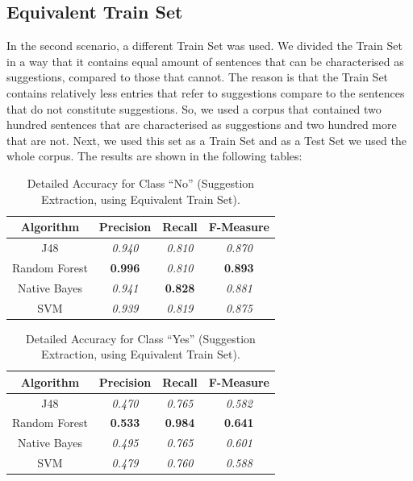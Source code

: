 \subsection{Equivalent Train Set}\label{422_ref}
In the second scenario, a different Train Set was used. We divided the Train Set in a way that it contains equal amount of sentences that can be characterised as suggestions, compared to those that cannot. The reason is that the Train Set contains relatively less entries that refer to suggestions compare to the sentences that do not constitute suggestions. So, we used a corpus that contained two hundred sentences that are characterised as suggestions and two hundred more that are not. Next, we used this set as a Train Set and as a Test Set we used the whole corpus. The results are shown in the following tables:
\begin{table}[H]
\centering
\caption{Detailed Accuracy for Class “No” (Suggestion Extraction, using Equivalent Train Set).}
\label{49_table_rer}
\begin{tabular}{cccc}
\hline
{\bf Algorithm} & {\bf Precision} & {\bf Recall} & {\bf F-Measure} \\ \hline
J48             & {\it 0.940}      & {\it 0.810}   & {\it 0.870}      \\
Random Forest   & {\bf 0.996}     & {\it 0.810}   & {\bf 0.893}     \\
Native Bayes    & {\it 0.941}     & {\bf 0.828}  & {\it 0.881}     \\
SVM             & {\it 0.939}     & {\it 0.819}  & {\it 0.875}     \\ \hline
\end{tabular}
\end{table}

\begin{table}[H]
\centering
\caption{Detailed Accuracy for Class “Yes” (Suggestion Extraction, using Equivalent Train Set).}
\label{410_table_rer}
\begin{tabular}{cccc}
\hline
{\bf Algorithm} & {\bf Precision} & {\bf Recall} & {\bf F-Measure} \\ \hline
J48             & {\it 0.470}      & {\it 0.765}  & {\it 0.582}     \\
Random Forest   & {\bf 0.533}     & {\bf 0.984}  & {\bf 0.641}     \\
Native Bayes    & {\it 0.495}     & {\it 0.765}  & {\it 0.601}     \\
SVM             & {\it 0.479}     & {\it 0.760}   & {\it 0.588}     \\ \hline
\end{tabular}
\end{table}

